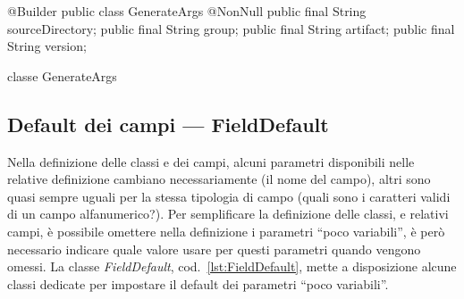 \documentclass[a4paper,10pt]{report}
\newif\ifesource
\newenvironment{elisting}[1][H]
  {\captionsetup{aboveskip=0pt}\begin{listing}[#1]}
  {\end{listing}%
}
\begin{document}
\ifesource
\begin{figure*}[!htb]
\begin{lstlisting}[language=java, caption=classe GenerateArgs, 
label=lst:GenerateArgs]
@Builder
public class GenerateArgs {
    @NonNull public final String sourceDirectory;
    public final String group;
    public final String artifact;
    public final String version;
}
\end{lstlisting}\index{GenerateArgs}
\end{figure*}
\else
\begin{elisting}[!htb]
\begin{javacode}
@Builder
public class GenerateArgs {
    @NonNull public final String sourceDirectory;
    public final String group;
    public final String artifact;
    public final String version;
}
\end{javacode}
\caption{classe GenerateArgs}
\label{lst:GenerateArgs}
\end{elisting}
\fi

\subsection{Default dei campi --- FieldDefault}
Nella definizione delle classi e dei campi, alcuni parametri disponibili nelle
relative definizione cambiano necessariamente (il nome del campo), altri sono
quasi sempre uguali per la stessa tipologia di campo (quali sono i caratteri
validi di un campo alfanumerico?).
Per semplificare la definizione delle classi, e relativi campi, è possibile
omettere nella definizione i parametri ``poco variabili'', è però necessario
indicare quale valore usare per questi parametri quando vengono omessi.
La classe \textsl{FieldDefault}, cod.~\ref{lst:FieldDefault}, mette a 
disposizione alcune classi dedicate per impostare il default dei parametri 
``poco variabili''.
\end{document}
